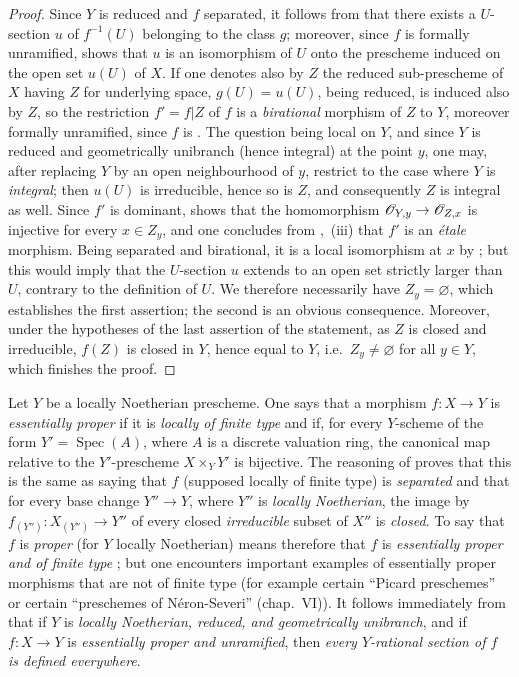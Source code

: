 \begin{proof}
Since $Y$ is reduced and $f$ separated, it follows from  that there exists a $U$-section $u$ of $f^{-1}(U)$ belonging to the class $g$; moreover, since $f$ is formally unramified,  shows that $u$ is an isomorphism of $U$ onto the prescheme induced on the open set $u(U)$ of $X$.
If one denotes also by $Z$ the reduced sub-prescheme of $X$ having $Z$ for underlying space, $g(U)=u(U)$, being reduced, is induced also by $Z$, so the restriction $f'=f|Z$ of $f$ is a \emph{birational} morphism of $Z$ to $Y$, moreover formally unramified, since $f$ is .
The question being local on $Y$, and since $Y$ is reduced and geometrically unibranch (hence integral) at the point $y$, one may, after replacing $Y$ by an open neighbourhood of $y$, restrict to the case where $Y$ is \emph{integral}; then $u(U)$ is irreducible, hence so is $Z$, and consequently $Z$ is integral as well.
Since $f'$ is dominant,  shows that the homomorphism $\mathscr{O}_{Y,y}\to\mathscr{O}_{Z,x}$ is injective for every $x\in Z_y$, and one concludes from ,~(iii) that $f'$ is an \emph{\'etale} morphism. Being separated and birational, it is a local isomorphism at $x$ by ; but this would imply that the $U$-section $u$ extends to an open set strictly larger than $U$, contrary to the definition of $U$.
We therefore necessarily have $Z_y=\varnothing$, which establishes the first assertion; the second is an obvious consequence.
Moreover, under the hypotheses of the last assertion of the statement, as $Z$ is closed and irreducible, $f(Z)$ is closed in $Y$, hence equal to $Y$, i.e.\ $Z_y\neq\varnothing$ for all $y\in Y$, which finishes the proof.
\end{proof}

\begin{remark}[18.10.20]
\label{IV.18.10.20}
Let $Y$ be a locally Noetherian prescheme.
One says that a morphism $f:X\to Y$ is \emph{essentially proper} if it is \emph{locally of finite type} and if, for every $Y$-scheme of the form $Y'=\operatorname{Spec}(A)$, where $A$ is a discrete valuation ring, the canonical map  relative to the $Y'$-prescheme $X\times_{Y}Y'$ is bijective.
The reasoning of  proves that this is the same as saying that $f$ (supposed locally of finite type) is \emph{separated} and that for every base change $Y''\to Y$, where $Y''$ is \emph{locally Noetherian}, the image by $f_{(Y'')}: X_{(Y'')}\to Y''$ of every closed \emph{irreducible} subset of $X''$ is \emph{closed}.
To say that $f$ is \emph{proper} (for $Y$ locally Noetherian) means therefore that $f$ is \emph{essentially proper and of finite type} ; but one encounters important examples of essentially proper morphisms that are not of finite type (for example certain ``Picard preschemes'' or certain ``preschemes of N\'eron-Severi'' (chap.~VI)).
It follows immediately from  that if $Y$ is \emph{locally Noetherian, reduced, and geometrically unibranch}, and if $f:X\to Y$ is \emph{essentially proper and unramified}, then \emph{every $Y$-rational section of $f$ is defined everywhere}.
\end{remark}

